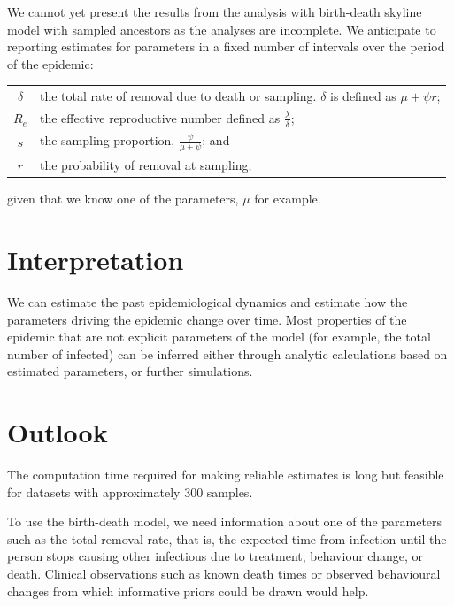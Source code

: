 \documentclass[11pt]{article}
\begin{document}
We cannot yet present the results from the analysis with birth-death skyline model with sampled ancestors as the analyses are incomplete. We anticipate to reporting estimates for parameters in a fixed number of intervals over the period of the epidemic: 
\vskip2mm

\begin{tabular} {cp{}}
$\delta$ & the total rate of removal due to death or sampling. $\delta$ is defined as  $\mu + \psi r$; \\

$R_e$ & the effective reproductive number defined as $\frac \lambda \delta$;  \\

$s$ & the sampling proportion, $\frac \psi {\mu + \psi}$; and\\

$r$ & the probability of removal at sampling; 
\end{tabular}

\vskip2mm

\noindent given that we know one of the parameters, $\mu$ for example.  

\section{Interpretation}

We can estimate the past epidemiological dynamics and estimate how the parameters driving the epidemic change over time.  Most properties of the epidemic that are not explicit parameters of the model (for example, the total number of infected) can be inferred either through analytic calculations based on estimated parameters, or further simulations.  

\section{Outlook}

 The computation time required for making reliable estimates is  long but feasible for datasets with approximately 300 samples. 


To use the birth-death model, we need information about one of the parameters such as the total removal rate, that is, the expected time from infection until the person stops causing other infectious due to treatment, behaviour change, or death.  Clinical observations such as known death times or observed behavioural changes from which informative priors could be drawn would help.
\end{document}
